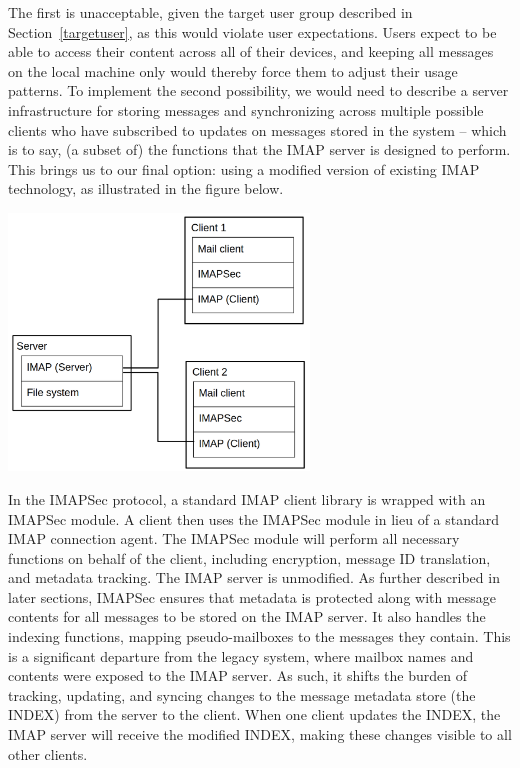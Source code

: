 \documentclass[pageno]{jpaper}
\newcommand{\project}{IMAPSec }
\begin{document}
The first is unacceptable, given the target user group described in Section~\ref{targetuser}, as this would violate user expectations. Users expect to be able to access their content across all of their devices, and keeping all messages on the local machine only would thereby force them to adjust their usage patterns. To implement the second possibility, we would need to describe a server infrastructure for storing messages and synchronizing across multiple possible clients who have subscribed to updates on messages stored in the system -- which is to say, (a subset of) the functions that the IMAP server is designed to perform. This brings us to our final option: using a modified version of existing IMAP technology, as illustrated in the figure below.

\begin{center}

\includegraphics[width=0.6\textwidth]{server_client_boxes}

\end{center}


In the \project protocol, a standard IMAP client library is wrapped with an \project module. A client then uses the \project module in lieu of a standard IMAP connection agent. The \project module will perform all necessary functions on behalf of the client, including encryption, message ID translation, and metadata tracking. The IMAP server is unmodified.
As further described in later sections, \project ensures that metadata is protected along with message contents for all messages to be stored on the IMAP server. It also handles the indexing functions, mapping pseudo-mailboxes to the messages they contain. This is a significant departure from the legacy system, where mailbox names and contents were exposed to the IMAP server. As such, it shifts the burden of tracking, updating, and syncing changes to the message metadata store (the INDEX) from the server to the client. When one client updates the INDEX, the IMAP server will receive the modified INDEX, making these changes visible to all other clients.
\end{document}

